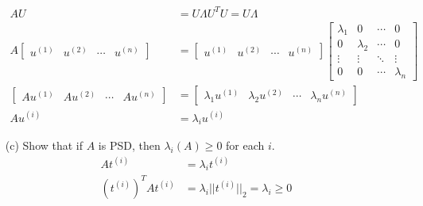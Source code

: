 \documentclass[11pt]{article}
\begin{document}
\begin{enumerate}
\begin{align*}
AU &= U \Lambda U^T U = U \Lambda \\
A \begin{bmatrix}
    u^{(1)} & u^{(2)} & \cdots & u^{(n)}
\end{bmatrix} &= \begin{bmatrix}
    u^{(1)} & u^{(2)} & \cdots & u^{(n)}
\end{bmatrix} \begin{bmatrix}
    \lambda_1 & 0 & \cdots & 0 \\
    0 & \lambda_2 & \cdots & 0 \\
    \vdots & \vdots & \ddots & \vdots \\
    0 & 0 & \cdots & \lambda_n
\end{bmatrix} \\
\begin{bmatrix}
    Au^{(1)} & Au^{(2)} & \cdots & Au^{(n)}
\end{bmatrix} &= \begin{bmatrix}
    \lambda_1 u^{(1)} & \lambda_2 u^{(2)} & \cdots & \lambda_n u^{(n)}
\end{bmatrix} \\
A u^{(i)} &= \lambda_i u^{(i)}
\end{align*}

\color{black}
\item[(c)] Show that if $A$ is PSD, then $\lambda_i(A) \geq 0$ for each $i$.
\color{blue}
\begin{equation*}
	\begin{aligned}
		At^{(i)} &= \lambda _i t ^ {(i)}\\
		(t^(i))^TAt^{(i)} &= \lambda _i  || t^{(i)} ||_2  = \lambda _i \geq 0
	\end{aligned}
\end{equation*}
\end{enumerate}
\end{document}
